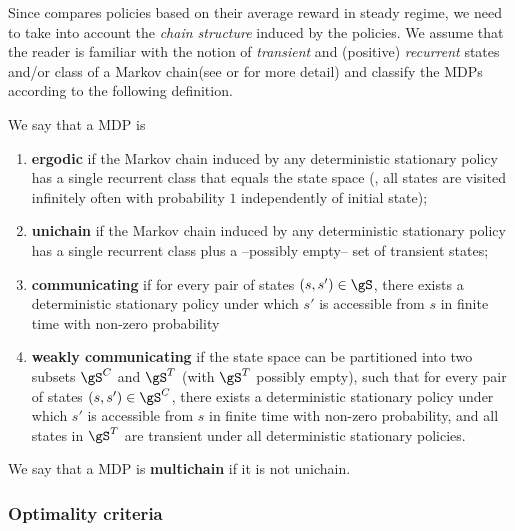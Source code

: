 Since  compares policies based on their average reward in steady regime, we need to take into account the \emph{chain structure} induced by the policies.
We assume that the reader is familiar with the notion of \emph{transient} and (positive) \emph{recurrent} states and/or class of a Markov chain(see \cite[Appendix~A]{puterman2014markov} or \cite{levin2017markov} for more detail) and classify the MDPs according to the following definition.
\begin{defn}
    \label{defn:mdp_struct}
    We say that a MDP is
    \begin{enumerate}
        \item \textbf{ergodic} if the Markov chain induced by any deterministic stationary policy has a single recurrent class that equals the state space (\ie, all states are visited infinitely often with probability $1$ independently of initial state);
        \item \textbf{unichain} if the Markov chain induced by any deterministic stationary policy has a single recurrent class plus a --possibly empty-- set of transient states;
        \item \textbf{communicating} if for every pair of states $(s,s')\in\gS$, there exists a deterministic stationary policy under which $s'$ is accessible from $s$ in finite time with non-zero probability
        \item \textbf{weakly communicating} if the state space can be partitioned into two subsets $\gS^C$ and $\gS^T$ (with $\gS^T$ possibly empty), such that for every pair of states $(s,s')\in\gS^C$, there exists a deterministic stationary policy under which $s'$ is accessible from $s$ in finite time with non-zero probability, and all states in $\gS^T$ are transient under all deterministic stationary policies.
    \end{enumerate}
    We say that a MDP is \textbf{multichain} if it is not unichain.
\end{defn}

\subsubsection{Optimality criteria}


